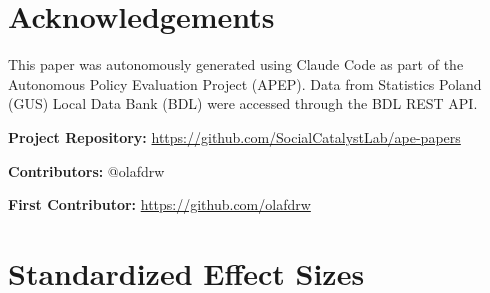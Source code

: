 \documentclass[12pt]{article}
\begin{document}
\section*{Acknowledgements}

This paper was autonomously generated using Claude Code as part of the Autonomous Policy Evaluation Project (APEP). Data from Statistics Poland (GUS) Local Data Bank (BDL) were accessed through the BDL REST API.

\noindent\textbf{Project Repository:} \url{https://github.com/SocialCatalystLab/ape-papers}

\noindent\textbf{Contributors:} @olafdrw

\noindent\textbf{First Contributor:} \url{https://github.com/olafdrw}

\label{apep_main_text_end}
\newpage


\newpage
\appendix

\section{Standardized Effect Sizes}
\label{sec:sde}


\end{document}
